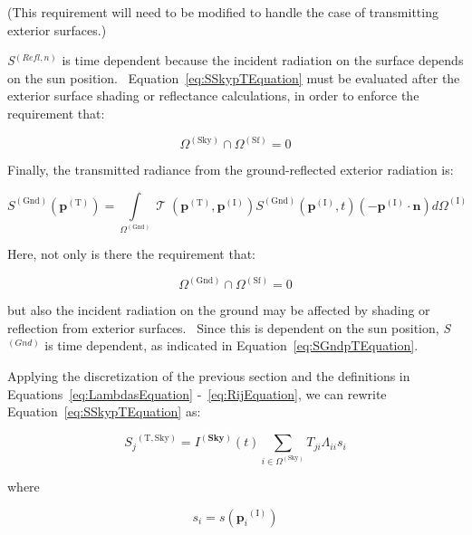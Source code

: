 (This requirement will need to be modified to handle the case of transmitting exterior surfaces.)

\emph{S}\(^{(Refl,n)}\) is time dependent because the incident radiation on the surface depends on the sun position.~ Equation~\ref{eq:SSkypTEquation} must be evaluated after the exterior surface shading or reflectance calculations, in order to enforce the requirement that:

\begin{equation}
{\Omega ^{{\mathrm{(Sky)}}}} \cap {\Omega ^{{\mathrm{(Sf)}}}} = 0
\end{equation}

Finally, the transmitted radiance from the ground-reflected exterior radiation is:

\begin{equation}
{S^{{\mathrm{(Gnd)}}}}({{\mathbf{p}}^{{\mathrm{(T)}}}}) = \int\limits_{{\Omega ^{{\mathrm{(Gnd)}}}}} {\operatorname{\mathcal{T}} ({{\mathbf{p}}^{{\mathrm{(T)}}}},{{\mathbf{p}}^{{\mathrm{(I)}}}}){S^{{\mathrm{(Gnd)}}}}({{\mathbf{p}}^{{\mathrm{(I)}}}},t)\left( { - {{\mathbf{p}}^{{\mathrm{(I)}}}}\cdot {\mathbf{n}}} \right)d{\Omega ^{{\mathrm{(I)}}}}}
\label{eq:SGndpTEquation}
\end{equation}

Here, not only is there the requirement that:

\begin{equation}
{\Omega ^{{\mathrm{(Gnd)}}}} \cap {\Omega ^{{\mathrm{(Sf)}}}} = 0
\end{equation}

but also the incident radiation on the ground may be affected by shading or reflection from exterior surfaces.~ Since this is dependent on the sun position, \emph{S}\(^{(Gnd)}\) is time dependent, as indicated in Equation~\ref{eq:SGndpTEquation}.

Applying the discretization of the previous section and the definitions in Equations~\ref{eq:LambdasEquation} -~\ref{eq:RijEquation}, we can rewrite Equation~\ref{eq:SSkypTEquation} as:

\begin{equation}
{S_j}^{{\mathrm{(T,Sky)}}} = {I^{({\mathbf{Sky}})}}(t)\sum\limits_{i \in {\Omega ^{{\mathrm{(Sky)}}}}} {{T_{ji}}{\Lambda_{ii}}{s_i}}
\end{equation}

where

\begin{equation}
{s_i} = s({{\mathbf{p}}_i}^{{\mathrm{(I)}}})
\end{equation}

